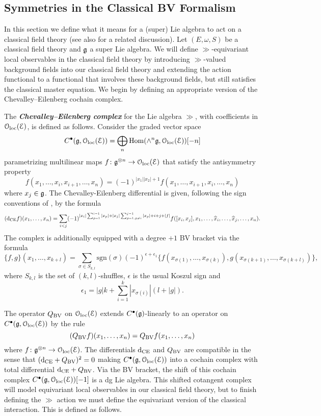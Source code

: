 \documentclass[10pt, oneside]{article}
\newcommand{\defterm}[1]{\textbf{\emph{#1}}}
\begin{document}
\subsection{Symmetries in the Classical BV Formalism} \label{symmetry_section}
In this section we define what it means for a (super) Lie algebra to act on a classical field theory  (see also \cite[Chapter 11]{Book2} for a related discussion). Let $(E, \omega, S)$ be a classical field theory and $\mathfrak g$ a super Lie algebra.  We will define $\gg$-equivariant local observables in the classical field theory by introducing $\gg$-valued background fields into our classical field theory and extending the action functional to a functional that involves these background fields, but still satisfies the classical master equation.  We begin by defining an appropriate version of the Chevalley--Eilenberg cochain complex.

\begin{definition}
The \defterm{Chevalley--Eilenberg complex} for the Lie algebra $\gg$, with coefficients in $\mathcal{O}_{\rm loc}(\mathcal E)$, is defined as follows.  Consider the graded vector space
\[C^\bullet(\mathfrak g, \mathcal{O}_{\rm loc}(\mathcal E)) = \bigoplus_n \operatorname{Hom}(\wedge^n \mathfrak g, \mathcal{O}_{\rm loc}(\mathcal E))[-n]\]
parametrizing multilinear maps $f\colon \mathfrak g^{\otimes n}\rightarrow \mathcal{O}_{\rm loc}(\mathcal E)$ that satisfy the antisymmetry property
\[f(x_1, \dots, x_i, x_{i+1}, \dots, x_n) = (-1)^{|x_1||x_2|+1} f(x_1, \dots, x_{i+1}, x_i, \dots, x_n)\]
where $x_j \in \mathfrak g$.  The Chevalley-Eilenberg differential is given, following the sign conventions of \cite{SafronovCoisoInt}, by the formula
\[({\rm d}_{\mathrm{CE}} f)(x_1, \dots, x_n) = \sum_{i < j}(-1)^{|x_i| \sum_{p=1}^{i-1} |x_p| + |x_j| \sum_{p=1,p\neq i}^{j-1} |x_p| +i+j+|f|} f([x_i, x_j], x_1, \dots, \widehat{x}_i, \dots, \widehat{x}_j, \dots, x_n).\]
The complex is additionally equipped with a degree $+1$ BV bracket via the formula
\[\{f, g\}(x_1, \dots, x_{k+l}) = \sum_{\sigma\in S_{k, l}} \mathrm{sgn}(\sigma) (-1)^{\epsilon+\epsilon_1} \{f(x_{\sigma(1)}, \dots, x_{\sigma(k)}), g(x_{\sigma(k+1)}, \dots, x_{\sigma(k+l)})\},\]
where $S_{k, l}$ is the set of $(k, l)$-shuffles, $\epsilon$ is the usual Koszul sign and
\[\epsilon_1 = |g|k + \sum_{i=1}^k |x_{\sigma(i)}|(l+|g|).\]
\end{definition}

The operator $Q_{\mathrm{BV}}$ on $\mathcal{O}_{\rm loc}(\mathcal E)$ extends $C^\bullet(\mathfrak g)$-linearly to an operator on $C^\bullet(\mathfrak g, \mathcal{O}_{\rm loc}(\mathcal E))$ by the rule
\[
(Q_{\mathrm{BV}} f)(x_1,\ldots, x_n) = Q_{\mathrm{BV}} f(x_1,\ldots, x_n) 
\]
where $f \colon \mathfrak g^{\otimes n} \to \mathcal{O}_{\rm loc}(\mathcal E)$. 
The differentials ${\rm d}_{\mathrm{CE}}$ and $Q_{\mathrm{BV}}$ are compatible in the sense that $({\rm d}_{\mathrm{CE}} + Q_{\mathrm{BV}})^2 = 0$ making $C^\bullet(\mathfrak g, \mathcal{O}_{\rm loc}(\mathcal E))$ into a cochain complex with total differential ${\rm d}_{\mathrm{CE}} + Q_{\mathrm{BV}}$. 
Via the BV bracket, the shift of this cochain complex $C^\bullet(\mathfrak g, \mathcal{O}_{\rm loc}(\mathcal E))[-1]$ is a dg Lie algebra.  This shifted cotangent complex will model equivariant local observables in our classical field theory, but to finish defining the $\gg$ action we must define the equivariant version of the classical interaction.  This is defined as follows.
\end{document}
